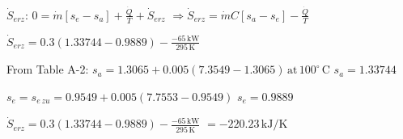 \( \dot{S}_{erz} \):  
\( 0 = \dot{m} [s_e - s_a] + \frac{\dot{Q}}{T} + \dot{S}_{erz} \)  
\( \Rightarrow \dot{S}_{erz} = \dot{m} C [s_a - s_e] - \frac{\dot{Q}}{T} \)  

\( \dot{S}_{erz} = 0.3 (1.33744 - 0.9889) - \frac{-65 \, \text{kW}}{295 \, \text{K}} \)  

From Table A-2:  
\( s_a = 1.3065 + 0.005 (7.3549 - 1.3065) \, \text{at} \, 100^\circ \, \text{C} \)  
\( s_a = 1.33744 \)  

\( s_e = s_{e \, zu} = 0.9549 + 0.005 (7.7553 - 0.9549) \)  
\( s_e = 0.9889 \)  

\( \dot{S}_{erz} = 0.3 (1.33744 - 0.9889) - \frac{-65 \, \text{kW}}{295 \, \text{K}} \)  
\( = -220.23 \, \text{kJ/K} \)